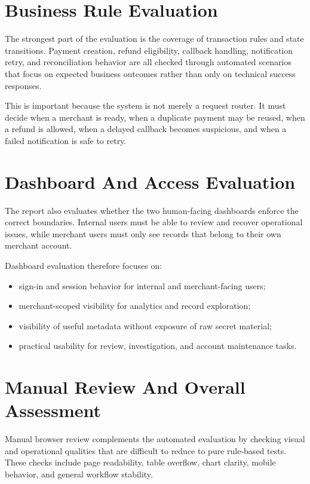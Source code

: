 \section{Business Rule Evaluation}

The strongest part of the evaluation is the coverage of transaction rules and
state transitions. Payment creation, refund eligibility, callback handling,
notification retry, and reconciliation behavior are all checked through
automated scenarios that focus on expected business outcomes rather than only on
technical success responses.

This is important because the system is not merely a request router. It must
decide when a merchant is ready, when a duplicate payment may be reused, when a
refund is allowed, when a delayed callback becomes suspicious, and when a
failed notification is safe to retry.

\section{Dashboard And Access Evaluation}

The report also evaluates whether the two human-facing dashboards enforce the
correct boundaries. Internal users must be able to review and recover
operational issues, while merchant users must only see records that belong to
their own merchant account.

Dashboard evaluation therefore focuses on:

\begin{itemize}
  \item sign-in and session behavior for internal and merchant-facing users;
  \item merchant-scoped visibility for analytics and record exploration;
  \item visibility of useful metadata without exposure of raw secret material;
  \item practical usability for review, investigation, and account maintenance
  tasks.
\end{itemize}

\section{Manual Review And Overall Assessment}

Manual browser review complements the automated evaluation by checking visual
and operational qualities that are difficult to reduce to pure rule-based
tests. These checks include page readability, table overflow, chart clarity,
mobile behavior, and general workflow stability.


